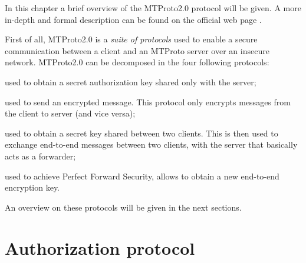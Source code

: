 
In this chapter a brief overview of the MTProto2.0 protocol will be given. A more in-depth and formal description can be found on the official web page \cite{Telegram-MTProto2.0}.

First of all, MTProto2.0 is a \textit{suite of protocols} used to enable a secure communication between a client and an MTProto server over an insecure network. MTProto2.0 can be decomposed in the four following protocols:

\begin{description}[style=nextline]
    \item[Authorization] used to obtain a secret authorization key shared only with the server;
    \item[Cloud-chat] used to send an encrypted message. This protocol only encrypts messages from the client to server (and vice versa);
    \item[Secret-chat] used to obtain a secret key shared between two clients. This is then used to exchange end-to-end messages between two clients, with the server that basically acts as a forwarder;
    \item[Rekeying] used to achieve Perfect Forward Security, allows to obtain a new end-to-end encryption key.
\end{description}

An overview on these protocols will be given in the next sections.

\section{Authorization protocol}

